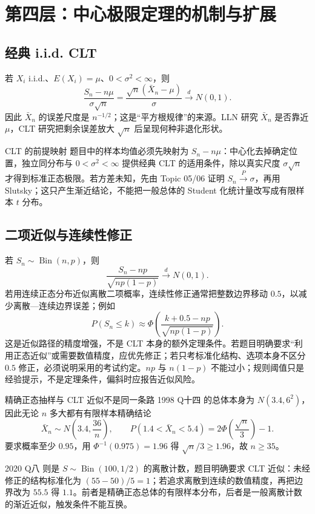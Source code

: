 \documentclass[11pt,a4paper]{ctexart}
\newenvironment{handbookdiagram}{\par\vspace{0.4em}\noindent\begin{center}}{\end{center}\vspace{0.4em}}
\begin{document}
\section{第四层：中心极限定理的机制与扩展}

\subsection{经典 i.i.d. CLT}

若 $X_i$ i.i.d.、$E(X_i)=\mu$、$0<\sigma^2<\infty$，则
\[
\boxed{\frac{S_n-n\mu}{\sigma\sqrt n}=\frac{\sqrt n(\bar X_n-\mu)}\sigma\xrightarrow{d}N(0,1)}.
\]
因此 $\bar X_n$ 的误差尺度是 $n^{-1/2}$；这是“平方根规律”的来源。LLN 研究 $\bar X_n$ 是否靠近 $\mu$，CLT 研究把剩余误差放大 $\sqrt n$ 后呈现何种非退化形状。

\begin{handbookdiagram}
\resizebox{0.92\linewidth}{!}{%
%
}
\end{handbookdiagram}

\begin{methodbox}{CLT 的前提映射}
题目中的样本均值必须先映射为 $S_n-n\mu$：中心化去掉确定位置，独立同分布与 $0<\sigma^2<\infty$ 提供经典 CLT 的适用条件，除以真实尺度 $\sigma\sqrt n$ 才得到标准正态极限。若方差未知，先由 Topic 05/06 证明 $S_n\xrightarrow{P}\sigma$，再用 Slutsky；这只产生渐近结论，不能把一般总体的 Student 化统计量改写成有限样本 $t$ 分布。
\end{methodbox}

\subsection{二项近似与连续性修正}

若 $S_n\sim\operatorname{Bin}(n,p)$，则
\[
\frac{S_n-np}{\sqrt{np(1-p)}}\xrightarrow{d}N(0,1).
\]
若用连续正态分布近似离散二项概率，连续性修正通常把整数边界移动 $0.5$，以减少离散—连续边界误差；例如
\[
P(S_n\le k)\approx
\Phi\!\left(\frac{k+0.5-np}{\sqrt{np(1-p)}}\right).
\]
这是近似路径的精度增强，不是 CLT 本身的额外定理条件。若题目明确要求“利用正态近似”或需要数值精度，应优先修正；若只考标准化结构、选项本身不区分 $0.5$ 修正，必须说明采用的考试约定。$np$ 与 $n(1-p)$ 不能过小；规则阈值只是经验提示，不是定理条件，偏斜时应报告近似风险。

\begin{examplebox}{精确正态抽样与 CLT 近似不是同一条路}
1998 Q十四 的总体本身为 $N(3.4,6^2)$，因此无论 $n$ 多大都有有限样本精确结论
\[
\bar X_n\sim N\left(3.4,\frac{36}{n}\right),
\qquad
P(1.4<\bar X_n<5.4)=2\Phi\left(\frac{\sqrt n}{3}\right)-1.
\]
要求概率至少 $0.95$，用 $\Phi^{-1}(0.975)=1.96$ 得 $\sqrt n/3\ge1.96$，故 $n\ge35$。

2020 Q八 则是 $S\sim\operatorname{Bin}(100,1/2)$ 的离散计数，题目明确要求 CLT 近似：未经修正的结构标准化为 $(55-50)/5=1$；若追求离散到连续的数值精度，再把边界改为 $55.5$ 得 $1.1$。前者是精确正态总体的有限样本分布，后者是一般离散计数的渐近近似，触发条件不能互换。
\end{examplebox}
\end{document}
